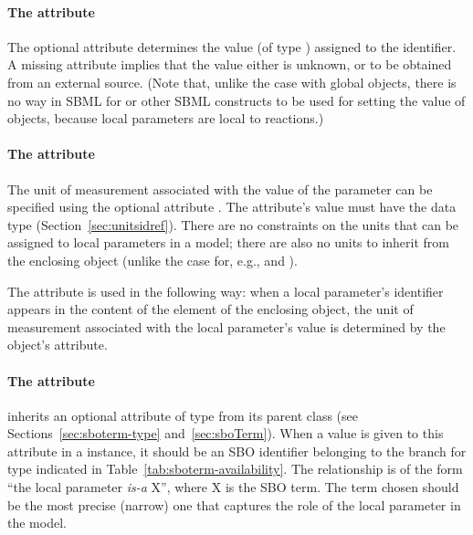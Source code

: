 \paragraph{The  attribute}

The optional attribute  determines the value (of type
) assigned to the identifier.  A missing
 attribute implies that the value either is unknown,
or to be obtained from an external source.  (Note that, unlike the
case with global \Parameter objects, there is no way in SBML
\thisLV for \InitialAssignment or other SBML constructs to be used
for setting the value of \LocalParameter objects, because local
parameters are local to reactions.)


\paragraph{The  attribute}
\label{subsec:localparameter-units}

The unit of measurement associated with the value of the parameter
can be specified using the optional attribute .  The
attribute's value must have the data type 
(Section~\ref{sec:unitsidref}).  There are no constraints on the
units that can be assigned to local parameters in a model; there
are also no units to inherit from the enclosing \Model object
(unlike the case for, e.g., \Species and \Compartment).

The  attribute is used in the following way: when a
local parameter's identifier appears in the content of the
 element of the enclosing \KineticLaw object, the unit
of measurement associated with the local parameter's value is
determined by the \LocalParameter object's 
attribute.


\paragraph{The  attribute}

\LocalParameter inherits an optional  attribute of
type  from its parent class \SBase (see
Sections~\ref{sec:sboterm-type} and~\ref{sec:sboTerm}).  When a
value is given to this attribute in a \LocalParameter instance, it
should be an SBO identifier belonging to the branch for type
\LocalParameter indicated in Table~\ref{tab:sboterm-availability}.
The relationship is of the form ``the local parameter \emph{is-a}
X'', where X is the SBO term.  The term chosen should be the most
precise (narrow) one that captures the role of the local parameter
in the model.

